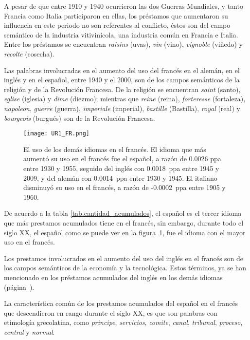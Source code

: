 A pesar de que entre 1910 y 1940 ocurrieron las dos Guerras Mundiales, y tanto Francia como Italia participaron en ellas,  los préstamos que aumentaron su influencia en este periodo no son referentes al conflicto, éstos son del campo semántico de la industria vitivinícola, una industria común en Francia e Italia. Entre los préstamos se encuentran \textit{raisins} (uvas), \textit{vin} (vino), \textit{vignoble} (viñedo) y \textit{recolte} (cosecha). 

Las palabras involucradas en el aumento del uso del francés en el alemán, en el inglés y en el español, entre 1940 y el 2000, son de los campos semánticos de la religión y de la Revolución Francesa. De la religión se encuentran \textit{saint} (santo), \textit{eglise} (iglesia) y \textit{dime} (diezmo); mientras que \textit{reine} (reina), \textit{forteresse} (fortaleza), \textit{napoleon}, \textit{guerre} (guerra), \textit{imperiale} (imperial), \textit{bastille} (Bastilla), \textit{royal} (real) y \textit{bourgeois} (burgués) son de la Revolución Francesa. 
\label{FR-D}


\begin{figure}[h!]
	\centering
	\texttt{[image: UR1\_FR.png]}
	\caption{El uso de los demás idiomas en el francés. El idioma que más aumentó su uso en el francés fue el español, a razón de  0.0026 ppa entre 1930 y 1955, seguido del inglés con 0.0018~ppa entre 1945 y 2009, y del alemán con 0.0014~ppa entre 1930 y 1945. El italiano  disminuyó su uso en el francés, a razón de -0.0002~ppa entre 1905 y 1960.}
	\label{fig.UR_FR}
\end{figure}
		
De acuerdo a la tabla \ref{tab.cantidad_acumulados},  el español es el tercer idioma que más prestamos acumulados tiene en el francés, sin embargo, durante todo el siglo XX, el español como se puede ver en la figura~\ref{fig.UR_FR}, fue el idioma con el mayor uso en el francés.

Los prestamos involucrados en el aumento del uso del inglés en el francés son de los campos semánticos de la economía y la tecnológica. Estos términos, ya se han mencionado en los préstamos acumulados del inglés en los demás idiomas (página~\pageref{EN-D}).
	
La característica común de los prestamos acumulados del español en el francés que descendieron en rango durante el siglo XX, es que son palabras con etimología grecolatina,  como \textit{principe}, \textit{servicios}, \textit{comite}, \textit{canal}, \textit{tribunal}, \textit{proceso}, \textit{central} y \textit{normal}. 
\label{D-FR}



